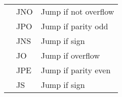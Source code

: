 \begin{frame}
\begin{table}[]
{\begin{tabular}{|l|l|l|}
                                                & JNO & Jump if not overflow \\ \cline{2-3}
                                                & JPO & Jump if parity odd \\ \cline{2-3}
                                                & JNS & Jump if sign \\ \cline{2-3}
                                                & JO & Jump if overflow \\ \cline{2-3}
                                                & JPE & Jump if parity even \\ \cline{2-3}
                                                & JS & Jump if sign \\ \hline
            \end{tabular}
        }
    \end{table}
\end{frame}